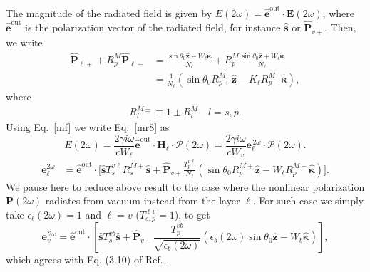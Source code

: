 \documentclass[10pt]{book}
\begin{document}
The magnitude of the radiated field is given by
$E(2\omega)=\hat{\mathbf{e}}^{\mathrm{out}}\cdot\mathbf{E}(2\omega)$, where
$\hat{\mathbf{e}}^{\mathrm{out}}$ is the polarization vector of the radiated
field, for instance $\hat{\mathbf{s}}$ or $\hat{\mathbf{P}}_{v+}$. Then, we
write
\begin{equation}\label{m1}
\begin{split}
\hat{\mathbf{P}}_{\ell +} + R^M_p\hat{\mathbf{P}}_{\ell -}
&= \frac{\sin\theta_0\hat{\mathbf{z}} - W_{\ell}\hat{\boldsymbol{\kappa}}}
        {N_{\ell}}
 + R^M_p
   \frac{\sin\theta_0\hat{\mathbf{z}} + W_{\ell}\hat{\boldsymbol{\kappa}}}
        {N_{\ell}}
\\
&= \frac{1}{N_{\ell}}
\left(
\sin\theta_0R^M_{p+}\hat{\mathbf{z}}
- K_{\ell}R^M_{p-}\hat{\boldsymbol{\kappa}}
\right)
,
\end{split}
\end{equation}
where
\begin{align}\label{rm}
R^{M\pm}_l\equiv 1 \pm R^M_l \quad l=s,p
.
\end{align}
 Using Eq.~\eqref{mf}
 we write Eq.~\eqref{mr8} as
\begin{equation}\label{r10}
E(2\omega) = \frac{2\gamma i \omega}{cW_\ell}
\hat{\mathbf{e}}^{\mathrm{out}}\cdot 
\mathbf{H}_{\ell}\cdot 
\boldsymbol{\mathcal{P}}(2\omega) 
= \frac{2\gamma i \omega}{cW_v}
 \mathbf{e}^{\,2\omega}_{\ell}\cdot\boldsymbol{\mathcal{P}}(2\omega). 
\end{equation}
\begin{equation}\label{r12mm}
\begin{split}
\mathbf{e}^{2\omega}_{\ell} &=\hat{\mathbf{e}}^{\mathrm{out}}\cdot 
\Bigg[
\hat{\mathbf{s}}T_{s}^{v\ell}R^{M+}_s\hat{\mathbf{s}} + 
\hat{\mathbf{P}}_{v+}
\frac{T^{v\ell}_{p}}
     {N_\ell}
\left(
\sin\theta_0R^{M+}_p\hat{\mathbf{z}}
- W_{\ell}R^{M-}_p\hat{\boldsymbol{\kappa}}
\right) 
\Bigg]
. 
\end{split}
\end{equation}  
 We pause here to reduce above result to the case where the nonlinear
polarization $\mathbf{P}(2\omega)$ radiates from vacuum instead from the layer
$\ell$. For such case we simply take $\epsilon_{\ell}(2\omega)=1$ and $\ell=v$
($T^{\ell v}_{s,p}=1$), to get
\begin{equation}\label{r13}
\mathbf{e}^{\,2\omega}_{v} = \hat{\mathbf{e}}^{\mathrm{out}}
\cdot\left[
\hat{\mathbf{s}}T_s^{v b}\hat{\mathbf{s}} + \hat{\mathbf{P}}_{v+}
\frac{T^{v b}_{p}}{\sqrt{\epsilon_{b}(2\omega)}}
\left(
  \epsilon_{b}(2\omega)\sin\theta_0\hat{\mathbf{z}}
  - W_{b}\hat{\boldsymbol{\kappa}}
\right) 
\right] 
,
\end{equation}
which agrees with Eq. (3.10) of Ref. \cite{mizrahiJOSA88}.
\end{document}
